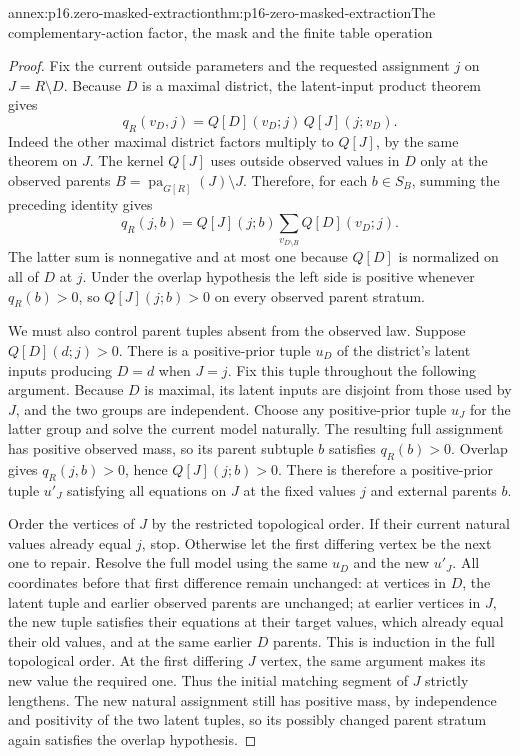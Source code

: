 \begin{annexitem}{annex:p16.zero-masked-extraction}{thm:p16-zero-masked-extraction}{The complementary-action factor, the mask and the finite table operation}
\begin{proof}
Fix the current outside parameters and the requested assignment
\(j\) on \(J=R\setminus D\). Because \(D\) is a
maximal district, the latent-input product theorem gives
\[
 q_R(v_D,j)=Q[D](v_D;j)\,Q[J](j;v_D).
\]
Indeed the other maximal district factors multiply to \(Q[J]\),
by the same theorem on \(J\). The kernel \(Q[J]\) uses
outside observed values in \(D\) only at the observed parents
\(B=\operatorname{pa}_{G[R]}(J)\setminus J\). Therefore,
for each \(b\in S_B\), summing the preceding identity gives
\[
 q_R(j,b)=Q[J](j;b)\sum_{v_{D\setminus B}}Q[D](v_D;j).
\]
The latter sum is nonnegative and at most one because \(Q[D]\)
is normalized on all of \(D\) at \(j\). Under the overlap
hypothesis the left side is positive whenever \(q_R(b)>0\),
so \(Q[J](j;b)>0\) on every observed parent stratum.

We must also control parent tuples absent from the observed law.
Suppose \(Q[D](d;j)>0\). There is a positive-prior tuple
\(u_D\) of the district's latent inputs producing \(D=d\)
when \(J=j\). Fix this tuple throughout the following argument.
Because \(D\) is maximal, its latent inputs are disjoint from
those used by \(J\), and the two groups are independent. Choose
any positive-prior tuple \(u_J\) for the latter group and solve
the current model naturally. The resulting full assignment has
positive observed mass, so its parent subtuple \(b\) satisfies
\(q_R(b)>0\). Overlap gives \(q_R(j,b)>0\), hence
\(Q[J](j;b)>0\). There is therefore a positive-prior tuple
\(u'_J\) satisfying all equations on \(J\) at the fixed
values \(j\) and external parents \(b\).

Order the vertices of \(J\) by the restricted topological order.
If their current natural values already equal \(j\), stop.
Otherwise let the first differing vertex be the next one to repair.
Resolve the full model using the same \(u_D\) and the new
\(u'_J\). All coordinates before that first difference remain
unchanged: at vertices in \(D\), the latent tuple and earlier
observed parents are unchanged; at earlier vertices in \(J\),
the new tuple satisfies their equations at their target values,
which already equal their old values, and at the same earlier
\(D\) parents. This is induction in the full topological order.
At the first differing \(J\) vertex, the same argument makes
its new value the required one. Thus the initial matching segment
of \(J\) strictly lengthens. The new natural assignment still
has positive mass, by independence and positivity of the two latent
tuples, so its possibly changed parent stratum again satisfies
the overlap hypothesis.


\end{proof}
\end{annexitem}
